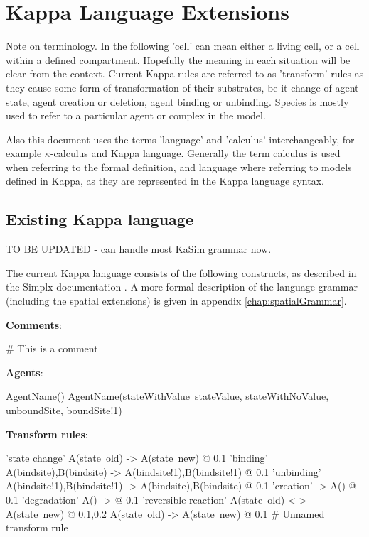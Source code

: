 \chapter{Kappa Language Extensions}

Note on terminology. In the following 'cell' can mean either a living cell, or a cell within a defined compartment. Hopefully the meaning in each situation will be clear from the context. Current Kappa rules are referred to as 'transform' rules as they cause some form of transformation of their substrates, be it change of agent state, agent creation or deletion, agent binding or unbinding. Species is mostly used to refer to a particular agent or complex in the model.

Also this document uses the terms 'language' and 'calculus' interchangeably, for example $\kappa$-calculus and Kappa language. Generally the term calculus is used when referring to the formal definition, and language where referring to models defined in Kappa, as they are represented in the Kappa language syntax.

\section{Existing Kappa language}

TO BE UPDATED - can handle most KaSim grammar now.

The current Kappa language consists of the following constructs, as described in the Simplx documentation \citep{krivine2009}. A more formal description of the language grammar (including the spatial extensions) is given in appendix \ref{chap:spatialGrammar}.

\textbf{Comments}:

\begin{kappasource}
# This is a comment
\end{kappasource} 

\textbf{Agents}:

\begin{kappasource}
AgentName()
AgentName(stateWithValue~stateValue, stateWithNoValue, unboundSite, boundSite!1)
\end{kappasource} 


\textbf{Transform rules}:

\begin{kappasource}
'state change' A(state~old) -> A(state~new) @ 0.1
'binding'      A(bindsite),B(bindsite) -> A(bindsite!1),B(bindsite!1) @ 0.1
'unbinding'    A(bindsite!1),B(bindsite!1) -> A(bindsite),B(bindsite) @ 0.1
'creation'     -> A() @ 0.1
'degradation'  A() -> @ 0.1
'reversible reaction'  A(state~old) <-> A(state~new) @ 0.1,0.2
A(state~old) -> A(state~new) @ 0.1 # Unnamed transform rule
\end{kappasource} 

